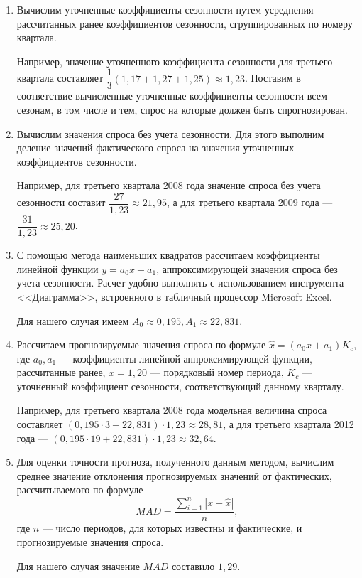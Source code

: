 \begin{enumerate}
\item Вычислим уточненные коэффициенты сезонности путем усреднения
  рассчитанных ранее коэффициентов сезонности,
  сгруппированных по номеру квартала.

  Например,
  значение уточненного коэффициента сезонности для третьего квартала
  составляет
  \( \dfrac{1}{3} (1{,}17 + 1{,}27 + 1{,}25) \approx 1{,}23 \).
  Поставим в соответствие
  вычисленные уточненные коэффициенты сезонности всем сезонам,
  в том числе и тем, спрос на которые должен быть спрогнозирован.

\item Вычислим значения спроса без учета сезонности.
  Для этого выполним деление значений фактического спроса на
  значения уточненных коэффициентов сезонности.

  Например, для третьего квартала 2008 года значение спроса
  без учета сезонности составит \( \dfrac{27}{1{,}23} \approx 21{,}95 \),
  а для третьего квартала 2009 года ---
  \( \dfrac{31}{1{,}23} \approx 25{,}20 \).

\item С помощью метода наименьших квадратов рассчитаем коэффициенты
  линейной функции \( y = a_0 x + a_1 \), аппроксимирующей значения спроса
  без учета сезонности. Расчет удобно выполнять с использованием инструмента
  <<Диаграмма>>, встроенного в табличный процессор Microsoft Excel.

  Для нашего случая имеем \( A_0 \approx 0{,}195, A_1 \approx 22{,}831 \).

\item Рассчитаем прогнозируемые значения спроса по формуле
  \( \hat{x} = (a_0 x + a_1) K_c \), где
  \( a_0, a_1 \) --- коэффициенты линейной аппроксимирующей функции,
  рассчитанные ранее,
  \( x = \overline{1,20} \) --- порядковый номер периода,
  \( K_c \) --- уточненный коэффициент сезонности, соответствующий
  данному кварталу.

  Например, для третьего квартала 2008 года модельная величина спроса
  составляет
  \( ( 0{,}195 \cdot 3 + 22{,}831 ) \cdot 1{,}23 \approx 28{,}81 \),
  а для третьего квартала 2012 года ---
  \( ( 0{,}195 \cdot 19 + 22{,}831 ) \cdot 1{,}23 \approx 32{,}64 \).

\item Для оценки точности прогноза, полученного данным методом, вычислим
  среднее значение отклонения прогнозируемых значений от фактических,
  рассчитываемого по формуле
  \begin{equation}
    \label{eq:mad}
    MAD = \dfrac{\sum^n_{i = 1} |x - \hat{x}|}{n},
  \end{equation}
  \hspace{1.5mm} где \( n \) --- число периодов,
  для которых известны и фактические, и прогнозируемые значения спроса.

  Для нашего случая значение \( MAD \) составило $1{,}29$.
\end{enumerate}

